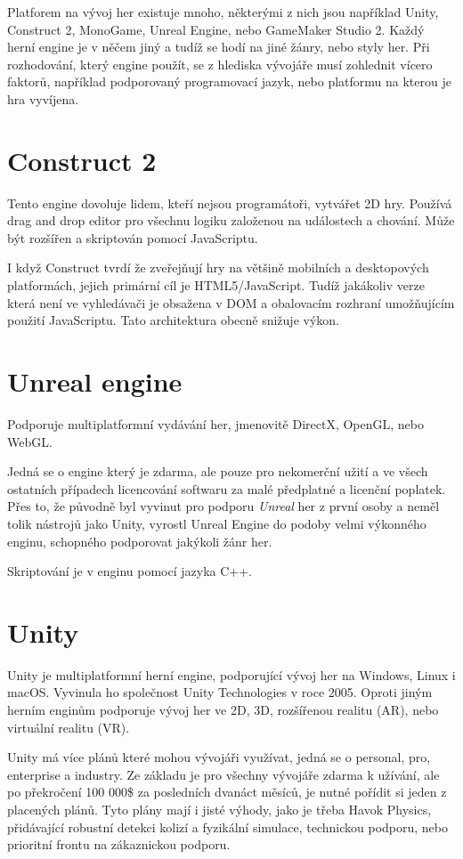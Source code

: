 Platforem na vývoj her existuje mnoho, některými z nich jsou například Unity, Construct 2, MonoGame, Unreal Engine, nebo GameMaker Studio 2. Každý herní engine je v něčem jiný a tudíž se hodí na jiné žánry, nebo styly her. Při rozhodování, který engine použít, se z hlediska vývojáře musí zohlednit vícero faktorů, například podporovaný programovací jazyk, nebo platformu na kterou je hra vyvíjena.~\cite{vohera2021game}

\section{Construct 2}
Tento engine dovoluje lidem, kteří nejsou programátoři, vytvářet 2D hry. Používá drag and drop editor pro všechnu logiku založenou na událostech a chování. Může být rozšířen a skriptován pomocí JavaScriptu. 

I když Construct tvrdí že zveřejňují hry na většině mobilních a desktopových platformách, jejich primární cíl je HTML5/JavaScript. Tudíž jakákoliv verze která není ve vyhledávači je obsažena v DOM a obalovacím rozhraní umožňujícím použití JavaScriptu. Tato architektura obecně snižuje výkon.~\cite{engines}

\section{Unreal engine}
Podporuje multiplatformní vydávání her, jmenovitě DirectX, OpenGL, nebo WebGL. 

Jedná se o engine který je zdarma, ale pouze pro nekomerční užití a ve všech ostatních případech licencování softwaru za malé předplatné a licenční poplatek. Přes to, že původně byl vyvinut pro podporu \textit{Unreal} her z první osoby a neměl tolik nástrojů jako Unity, vyrostl Unreal Engine do podoby velmi výkonného enginu, schopného podporovat jakýkoli žánr her.~\cite{engines}

Skriptování je v enginu pomocí jazyka C++.

\section{Unity}
\label{unity}
Unity je multiplatformní herní engine, podporující vývoj her na Windows, Linux i macOS.
Vyvinula ho společnost Unity Technologies v roce 2005. Oproti jiným herním enginům podporuje vývoj her ve 2D, 3D, rozšířenou realitu (AR), nebo virtuální realitu (VR). 

Unity má více plánů které mohou vývojáři využívat, jedná se o personal, pro, enterprise a industry. Ze základu je pro všechny vývojáře zdarma k užívání, ale po překročení 100 000\$ za posledních dvanáct měsíců, je nutné pořídit si jeden z placených plánů. Tyto plány mají i jisté výhody, jako je třeba Havok Physics, přidávající robustní detekci kolizí a fyzikální simulace, technickou podporu, nebo prioritní frontu na zákaznickou podporu.~\cite{UnityPlans} 


